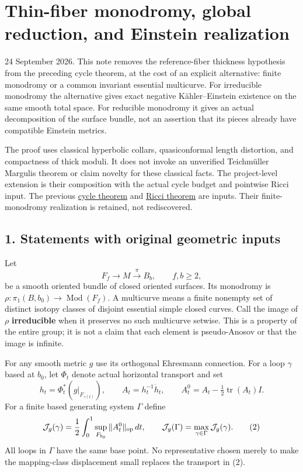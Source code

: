\documentclass[
  11pt,
]{article}
\author{}
\date{}
\begin{document}
\hypertarget{thin-fiber-monodromy-global-reduction-and-einstein-realization}{%
\section{Thin-fiber monodromy, global reduction, and Einstein
realization}\label{thin-fiber-monodromy-global-reduction-and-einstein-realization}}

24 September 2026. This note removes the reference-fiber thickness
hypothesis from the preceding cycle theorem, at the cost of an explicit
alternative: finite monodromy or a common invariant essential
multicurve. For irreducible monodromy the alternative gives exact
negative Kähler--Einstein existence on the same smooth total space. For
reducible monodromy it gives an actual decomposition of the surface
bundle, not an assertion that its pieces already have compatible
Einstein metrics.

The proof uses classical hyperbolic collars, quasiconformal length
distortion, and compactness of thick moduli. It does not invoke an
unverified Teichmüller Margulis theorem or claim novelty for these
classical facts. The project-level extension is their composition with
the actual cycle budget and pointwise Ricci input. The previous
\href{20260924_cycle_holonomy_realization.md}{cycle theorem} and
\href{20260924_ricci_monodromy_realization.md}{Ricci theorem} are
inputs. Their finite-monodromy realization is retained, not
rediscovered.

\hypertarget{statements-with-original-geometric-inputs}{%
\subsection{1. Statements with original geometric
inputs}\label{statements-with-original-geometric-inputs}}

Let \[
 F_f\longrightarrow M\xrightarrow{\pi}B_b,\qquad f,b\ge2,
\tag{1}
\] be a smooth oriented bundle of closed oriented surfaces. Its
monodromy is \(\rho:\pi_1(B,b_0)\to\operatorname{Mod}(F_f)\). A
multicurve means a finite nonempty set of distinct isotopy classes of
disjoint essential simple closed curves. Call the image of \(\rho\)
\textbf{irreducible} when it preserves no such multicurve setwise. This
is a property of the entire group; it is not a claim that each element
is pseudo-Anosov or that the image is infinite.

For any smooth metric \(g\) use its orthogonal Ehresmann connection. For
a loop \(\gamma\) based at \(b_0\), let \(\Phi_t\) denote actual
horizontal transport and set \[
 h_t=\Phi_t^*(g|_{F_{\gamma(t)}}),\qquad
 A_t=h_t^{-1}\dot h_t,\qquad
 A_t^0=A_t-\tfrac12\operatorname{tr}(A_t)I.
\] For a finite based generating system \(\Gamma\) define \[
 \mathcal J_g(\gamma)
   =\frac12\int_0^1\sup_{F_{b_0}}\|A_t^0\|_{\rm op}\,dt,
 \qquad
 \mathcal J_g(\Gamma)=\max_{\gamma\in\Gamma}\mathcal J_g(\gamma).
\tag{2}
\] All loops in \(\Gamma\) have the same base point. No representative
chosen merely to make the mapping-class displacement small replaces the
transport in (2).
\end{document}
